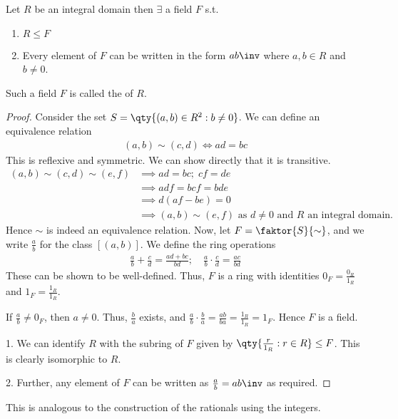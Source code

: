 \begin{theorem} \label{thm:9.5}
	Let $R$ be an integral domain then $\exists$ a field $F$ s.t.
	\begin{enumerate}
		\item $R \leq F$
		\item Every element of $F$ can be written in the form $a b\inv$ where $a, b \in R$ and $b \neq 0$.
	\end{enumerate} 
	Such a field $F$ is called the  of $R$.
\end{theorem}

\begin{proof}
	Consider the set $S = \qty{(a,b) \in R^2 : b \neq 0}$.
	We can define an equivalence relation
	\begin{align*}
		(a,b) \sim (c,d) \iff ad = bc
	\end{align*}
	This is reflexive and symmetric.
	We can show directly that it is transitive.
	\begin{align*}
		(a,b) \sim (c,d) \sim (e,f) &\implies ad = bc;\; cf = de \\
		                            &\implies adf = bcf = bde    \\
		                            &\implies d(af - be) = 0 \\
		                            &\implies (a,b) \sim (e,f) \text{ as $d \neq 0$ and $R$ an integral domain.}
	\end{align*}
	Hence $\sim$ is indeed an equivalence relation.
	Now, let $F = \faktor{S}{\sim}$, and we write $\frac{a}{b}$ for the class $[(a,b)]$.
	We define the ring operations
	\begin{align*}
		\frac{a}{b} + \frac{c}{d} = \frac{ad + bc}{bd};\quad \frac{a}{b} \cdot \frac{c}{d} = \frac{ac}{bd}
	\end{align*}
	These can be shown to be well-defined.
	Thus, $F$ is a ring with identities $0_F = \frac{0_R}{1_R}$ and $1_F = \frac{1_R}{1_R}$.

	If $\frac{a}{b} \neq 0_F$, then $a \neq 0$.
	Thus, $\frac{b}{a}$ exists, and $\frac{a}{b} \cdot \frac{b}{a} = \frac{ab}{ba} = \frac{1_R}{1_R} = 1_F$.
	Hence $F$ is a field.

	1. We can identify $R$ with the subring of $F$ given by $\qty{\frac{r}{1_R} : r \in R} \leq F$.
	This is clearly isomorphic to $R$.

	2.  Further, any element of $F$ can be written as $\frac{a}{b} = ab\inv$ as required.
\end{proof}
This is analogous to the construction of the rationals using the integers.


